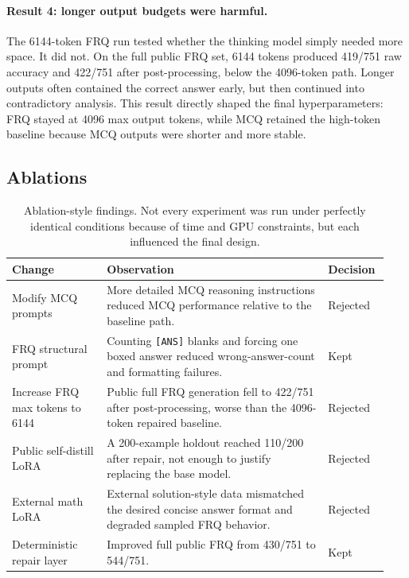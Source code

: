 \documentclass{article}
\begin{document}
\paragraph{Result 4: longer output budgets were harmful.}
The 6144-token FRQ run tested whether the thinking model simply needed more space. It did not. On the full public FRQ set, 6144 tokens produced 419/751 raw accuracy and 422/751 after post-processing, below the 4096-token path. Longer outputs often contained the correct answer early, but then continued into contradictory analysis. This result directly shaped the final hyperparameters: FRQ stayed at 4096 max output tokens, while MCQ retained the high-token baseline because MCQ outputs were shorter and more stable.

\subsection{Ablations}
\label{sec:ablations}

\begin{table}[h]
\caption{Ablation-style findings. Not every experiment was run under perfectly identical conditions because of time and GPU constraints, but each influenced the final design.}
\label{tab:ablations}
\centering
\begin{tabular}{p{0.24\linewidth}p{0.56\linewidth}p{0.14\linewidth}}
\toprule
Change & Observation & Decision \\
\midrule
Modify MCQ prompts & More detailed MCQ reasoning instructions reduced MCQ performance relative to the baseline path. & Rejected \\
FRQ structural prompt & Counting \texttt{[ANS]} blanks and forcing one boxed answer reduced wrong-answer-count and formatting failures. & Kept \\
Increase FRQ max tokens to 6144 & Public full FRQ generation fell to 422/751 after post-processing, worse than the 4096-token repaired baseline. & Rejected \\
Public self-distill LoRA & A 200-example holdout reached 110/200 after repair, not enough to justify replacing the base model. & Rejected \\
External math LoRA & External solution-style data mismatched the desired concise answer format and degraded sampled FRQ behavior. & Rejected \\
Deterministic repair layer & Improved full public FRQ from 430/751 to 544/751. & Kept \\
\bottomrule
\end{tabular}
\end{table}
\end{document}
